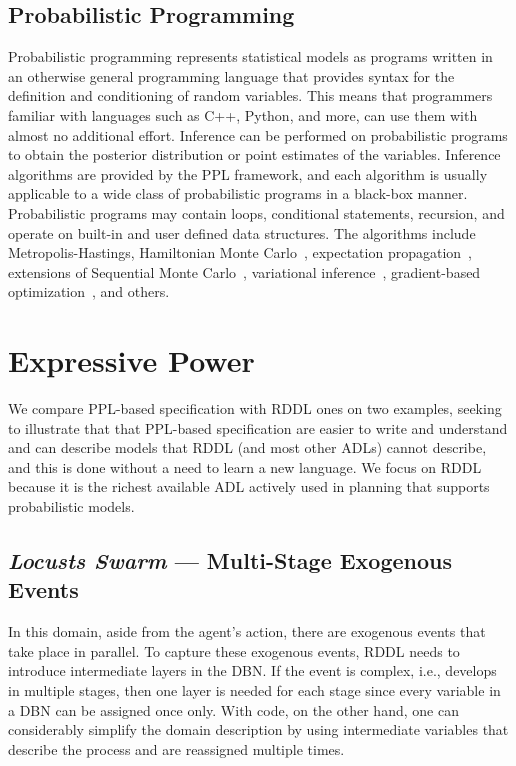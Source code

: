 \documentclass[letterpaper]{article} %
\theoremstyle{definition}
\begin{document}
\subsection{Probabilistic Programming}
Probabilistic programming \cite{GMR+08,MSP14,WVM14,GS15}
  represents statistical models as programs written in an
  otherwise general programming language that provides syntax
  for the definition and conditioning of random variables.
  This means that programmers familiar with languages
  such as C++, Python, and more, can use them with almost no
  additional effort.
  Inference can be performed on probabilistic programs to
  obtain the posterior distribution or point estimates of the
  variables. Inference algorithms are provided by the
  PPL framework, and each algorithm is
  usually applicable to a wide class of probabilistic programs
  in a black-box manner. Probabilistic programs may contain loops, conditional
  statements, recursion, and operate on built-in and user
  defined data structures. The algorithms include
  Metropolis-Hastings\cite{MSP14,YHG14}, Hamiltonian
  Monte Carlo~\cite{Stan17}, expectation
  propagation~\cite{MWG+10}, extensions of Sequential Monte
  Carlo~\cite{WVM14,MYM+15,PWD+14,RNL+2016,MS18}, variational
  inference~\cite{WW13,KTR+17}, gradient-based
  optimization~\cite{Stan17,BCJ+19}, and others.



\section{Expressive Power}
We compare PPL-based specification with RDDL ones on two examples, seeking to illustrate that that PPL-based specification are easier to write and understand and can describe models that RDDL (and most other ADLs) cannot describe, and this is done without a need to learn a new language.
We focus on RDDL because it is the richest available ADL actively used in planning that supports probabilistic models. %

\subsection{{\em Locusts Swarm} --- Multi-Stage Exogenous Events}
In this domain, aside from the agent's action, there are exogenous events that take place in parallel. To capture these exogenous events, RDDL needs to introduce intermediate layers in the DBN. If the event is complex, i.e., develops in multiple stages, then one layer is needed for each stage since every variable in a DBN can be assigned once only. With code, on the other hand, one can considerably simplify the domain description by using intermediate variables that describe the process and are reassigned multiple times.
\end{document}
